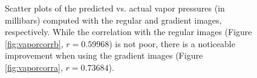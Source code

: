 \begin{figure}
	\centering
	\caption[Scatter plots of the predicted vs. actual vapor pressures (in millibars) computed with the regular and gradient images]{Scatter plots of the predicted vs. actual vapor pressures (in millibars) computed with the regular and gradient images, respectively. While the correlation with the regular images (Figure \ref{fig:vaporcorrb}, $r=0.59968$) is not poor, there is a noticeable improvement when using the gradient images (Figure \ref{fig:vaporcorra}, $r=0.73684$).}
	\label{fig:vaporcorr}
\end{figure}

